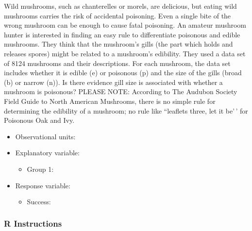 \documentclass[
]{report}
\providecommand{\tightlist}{%
  \setlength{\itemsep}{0pt}\setlength{\parskip}{0pt}}
\begin{document}
Wild mushrooms, such as chanterelles or morels, are delicious, but eating wild mushrooms carries the risk of accidental poisoning. Even a single bite of the wrong mushroom can be enough to cause fatal poisoning. An amateur mushroom hunter is interested in finding an easy rule to differentiate poisonous and edible mushrooms. They think that the mushroom's gills (the part which holds and releases spores) might be related to a mushroom's edibility. They used a data set of 8124 mushrooms and their descriptions. For each mushroom, the data set includes whether it is edible (e) or poisonous (p) and the size of the gills (broad (b) or narrow (n)). Is there evidence gill size is associated with whether a mushroom is poisonous? PLEASE NOTE: According to The Audubon Society Field Guide to North American Mushrooms, there is no simple rule for determining the edibility of a mushroom; no rule like ``leaflets three, let it be'\,' for Poisonous Oak and Ivy.

\vspace{2mm}

\begin{itemize}
\tightlist
\item
  Observational units:
\end{itemize}

\vspace{2mm}

\begin{itemize}
\item
  Explanatory variable:

  \begin{itemize}
  \tightlist
  \item
    Group 1:
  \end{itemize}
\end{itemize}

\vspace{2mm}

\begin{itemize}
\item
  Response variable:

  \begin{itemize}
  \tightlist
  \item
    Success:
  \end{itemize}
\end{itemize}

\vspace{2mm}

\subsubsection*{R Instructions}\label{r-instructions-10}
\end{document}
